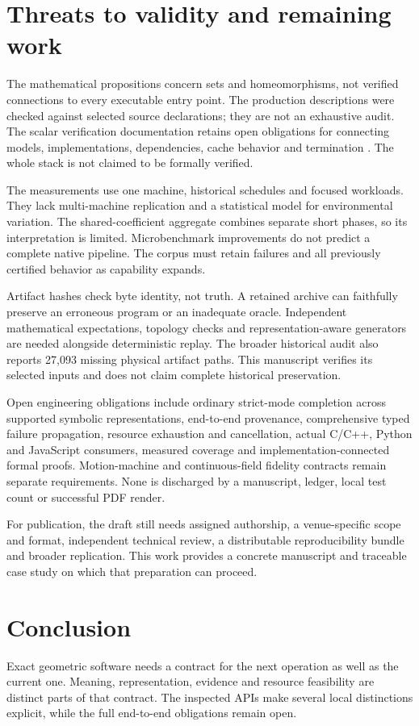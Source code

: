 \documentclass[11pt]{article}
\begin{document}
\section{Threats to validity and remaining work}
The mathematical propositions concern sets and homeomorphisms, not verified
connections to every executable entry point. The production descriptions were
checked against selected source declarations; they are not an exhaustive audit.
The scalar verification documentation retains open obligations for connecting
models, implementations, dependencies, cache behavior and termination
\cite{verification}. The whole stack is not claimed to be formally verified.

The measurements use one machine, historical schedules and focused workloads.
They lack multi-machine replication and a statistical model for environmental
variation. The shared-coefficient aggregate combines separate short phases, so
its interpretation is limited. Microbenchmark improvements do not predict a
complete native pipeline. The corpus must retain failures and all previously
certified behavior as capability expands.

Artifact hashes check byte identity, not truth. A retained archive can faithfully
preserve an erroneous program or an inadequate oracle. Independent mathematical
expectations, topology checks and representation-aware generators are needed
alongside deterministic replay. The broader historical audit also reports
27,093 missing physical artifact paths. This manuscript verifies its selected
inputs and does not claim complete historical preservation.

Open engineering obligations include ordinary strict-mode completion across
supported symbolic representations, end-to-end provenance, comprehensive typed
failure propagation, resource exhaustion and cancellation, actual C/C++, Python
and JavaScript consumers, measured coverage and implementation-connected formal
proofs. Motion-machine and continuous-field fidelity contracts remain separate
requirements. None is discharged by a manuscript, ledger, local test count or
successful PDF render.

For publication, the draft still needs assigned authorship, a venue-specific
scope and format, independent technical review, a distributable reproducibility
bundle and broader replication. This work provides a concrete manuscript and
traceable case study on which that preparation can proceed.

\section{Conclusion}
Exact geometric software needs a contract for the next operation as well as the
current one. Meaning, representation, evidence and resource feasibility are
distinct parts of that contract. The inspected APIs make several local
distinctions explicit, while the full end-to-end obligations remain open.
\end{document}
